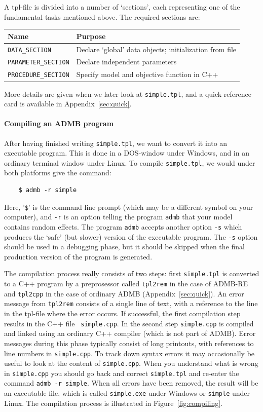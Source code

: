 \documentclass[12pt,letter,reqno]{book}
\begin{document}
A tpl-file is divided into a number of `sections', each representing one of the fundamental tasks mentioned
above. The required sections are:
\begin{center}
\begin{tabular}{ll}
\textbf{Name} & \textbf{Purpose} \\ \hline
\texttt{DATA\_SECTION} & Declare `global' data objects; initialization from file \\
\texttt{PARAMETER\_SECTION} & Declare independent parameters \\
\texttt{PROCEDURE\_SECTION} & Specify model and objective function in C++
\end{tabular}
\end{center}
More details are given when we later look at \texttt{simple.tpl}, and a quick reference
card is available in Appendix~\ref{sec:quick}.

\paragraph{Compiling an ADMB program}

After having finished writing \texttt{simple.tpl},
we want to convert it into an executable program. This is done in a
DOS-window under Windows, and in an ordinary terminal window under Linux. To
compile \texttt{simple.tpl}, we would under both platforms give the command:
\begin{lstlisting}
    $ admb -r simple
\end{lstlisting}
Here, '\texttt{\$}' is the command line prompt (which may be a different symbol on your computer), and
\texttt{-r} is an option telling the program \texttt{admb} that your model contains random effects. The program
\texttt{admb} accepts another option \texttt{-s} which produces the `safe' (but slower) version of the
executable program. The \texttt{-s} option should be used in a debugging phase, but it should be skipped when
the final production version of the program is generated.

The compilation process really consists of two steps: first \texttt{simple.tpl} is converted to a C++ program by
a preprosessor called \texttt{tpl2rem} in the case of ADMB-RE and \texttt{tpl2cpp} in the case of ordinary ADMB (Appendix~\ref{sec:quick}). 
An error message from \texttt{tpl2rem} consists of a 
single line of text, with a reference to the line in the tpl-file where the error occurs. 
If successful, the first compilation step results in
the C++ file \texttt{\ simple.cpp}. In the second step \texttt{simple.cpp} is compiled and linked using an
ordinary C++ compiler (which is not part of ADMB). Error messages during this phase typically consist of long
printouts, with references to line numbers in \texttt{simple.cpp}. To track down syntax errors it may
occasionally be useful to look at the content of \texttt{simple.cpp}. When you understand what is wrong in
\texttt{simple.cpp} you should go back and correct \texttt{simple.tpl} and re-enter the command \texttt{admb -r
simple}. When all errors have been removed, the result will be an executable file, which is called
\texttt{simple.exe} under Windows or \texttt{simple} under Linux. The compilation process is
illustrated in Figure~\ref{fig:compiling}.
\end{document}
